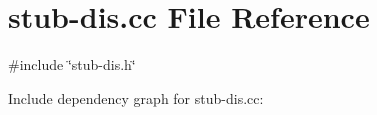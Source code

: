 \hypertarget{stub-dis_8cc}{
\section{stub-\/dis.cc File Reference}
\label{stub-dis_8cc}
}
{\ttfamily \#include \char`\"{}stub-\/dis.h\char`\"{}}\par
Include dependency graph for stub-\/dis.cc: